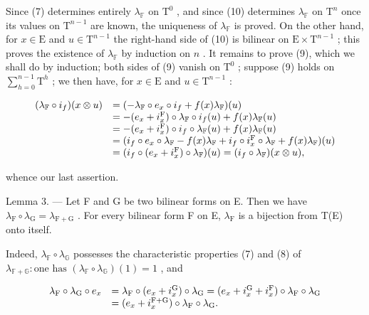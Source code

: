 Since (7) determines entirely \(\lambda_{\mathbb{F}}\) on \(\mathrm{T}^{0}\) , and since (10) determines \(\lambda_{\mathbb{F}}\) on \(\mathrm{T}^{n}\) once its values on \(\mathrm{T}^{n-1}\) are known, the uniqueness of \(\lambda_{\mathbb{F}}\) is proved. On the other hand, for \(x \in \mathrm{E}\) and \(u \in \mathrm{T}^{n-1}\) the right-hand side of (10) is bilinear on \(\mathrm{E} \times \mathrm{T}^{n-1}\) ; this proves the existence of \(\lambda_{\mathbb{F}}\) by induction on \(n\) . It remains to prove (9), which we shall do by induction; both sides of (9) vanish on \(\mathrm{T}^{0}\) ; suppose (9) holds on \(\sum_{h=0}^{n-1} \mathrm{T}^{h}\) ; we then have, for \(x \in \mathrm{E}\) and \(u \in \mathrm{T}^{n-1}\) :

\[
\begin{array}{r l} (\lambda_ {\mathbb {F}} \circ i _ {f}) (x \otimes u) & = (- \lambda_ {\mathbb {F}} \circ e _ {x} \circ i _ {f} + f (x) \lambda_ {\mathbb {F}}) (u) \\ & = - (e _ {x} + i _ {x} ^ {\mathrm{F}}) \circ \lambda_ {\mathbb {F}} \circ i _ {f} (u) + f (x) \lambda_ {\mathbb {F}} (u) \\ & = - (e _ {x} + i _ {x} ^ {\mathrm{F}}) \circ i _ {f} \circ \lambda_ {\mathbb {F}} (u) + f (x) \lambda_ {\mathbb {F}} (u) \\ & = (i _ {f} \circ e _ {x} \circ \lambda_ {\mathbb {F}} - f (x) \lambda_ {\mathbb {F}} + i _ {f} \circ i _ {x} ^ {\mathrm{F}} \circ \lambda_ {\mathbb {F}} + f (x) \lambda_ {\mathbb {F}}) (u) \\ & = (i _ {f} \circ (e _ {x} + i _ {x} ^ {\mathrm{F}}) \circ \lambda_ {\mathbb {F}}) (u) = (i _ {f} \circ \lambda_ {\mathbb {F}}) (x \otimes u), \end{array}
\]

whence our last assertion.

Lemma 3. --- Let F and G be two bilinear forms on E. Then we have \(\lambda_{\mathrm{F}} \circ \lambda_{\mathrm{G}} = \lambda_{\mathrm{F+G}}\) . For every bilinear form F on E, \(\lambda_{\mathrm{F}}\) is a bijection from T(E) onto itself.

Indeed, \(\lambda_{\mathbb{F}} \circ \lambda_{\mathbb{G}}\) possesses the characteristic properties (7) and (8) of \(\lambda_{\mathbb{F} + \mathbb{G}}: \text{one has } (\lambda_{\mathbb{F}} \circ \lambda_{\mathbb{G}})(1) = 1\) , and

\[
\begin{array}{r l} \lambda_ {\mathrm{F}} \circ \lambda_ {\mathrm{G}} \circ e _ {x} & = \lambda_ {\mathrm{F}} \circ (e _ {x} + i _ {x} ^ {\mathrm{G}}) \circ \lambda_ {\mathrm{G}} = (e _ {x} + i _ {x} ^ {\mathrm{G}} + i _ {x} ^ {\mathrm{F}}) \circ \lambda_ {\mathrm{F}} \circ \lambda_ {\mathrm{G}} \\ & = (e _ {x} + i _ {x} ^ {\mathrm{F+G}}) \circ \lambda_ {\mathrm{F}} \circ \lambda_ {\mathrm{G}}. \end{array}
\]

